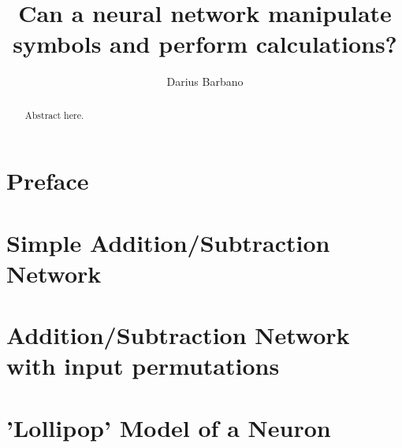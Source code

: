 \documentclass[12pt]{article}
\begin{document}
\title{Can a neural network manipulate symbols and perform calculations? }
\author{Darius Barbano}
\date{}
\maketitle
\begin{abstract}
   Abstract here.
\end{abstract}
\newpage
\section{Preface}


\newpage
\section{Simple Addition/Subtraction Network}


\section{Addition/Subtraction Network with input permutations}


\section{'Lollipop' Model of a Neuron}

\end{document}
